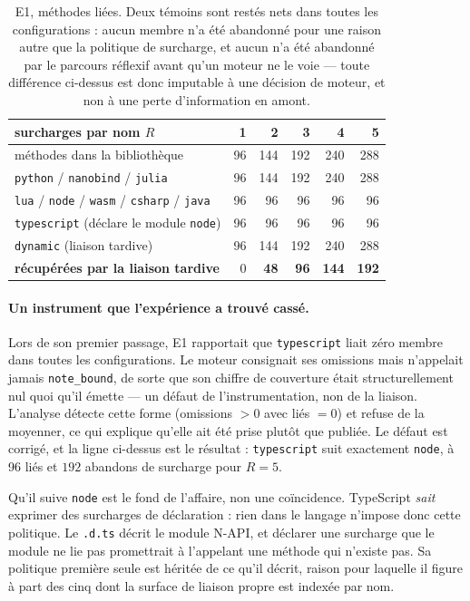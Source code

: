 \documentclass[11pt,a4paper]{article}
\newcommand{\code}[1]{\texttt{\small #1}}
\begin{document}
\begin{table}[h]
\centering\small
\begin{tabular}{lrrrrr}
\toprule
surcharges par nom $R$ & 1 & 2 & 3 & 4 & 5 \\
\midrule
méthodes dans la bibliothèque                   & 96 & 144 & 192 & 240 & 288 \\
\code{python} / \code{nanobind} / \code{julia}  & 96 & 144 & 192 & 240 & 288 \\
\code{lua} / \code{node} / \code{wasm} / \code{csharp} / \code{java} & 96 & 96 & 96 & 96 & 96 \\
\code{typescript} (déclare le module \code{node}) & 96 & 96 & 96 & 96 & 96 \\
\code{dynamic} (liaison tardive)                & 96 & 144 & 192 & 240 & 288 \\
\midrule
\textbf{récupérées par la liaison tardive}      & 0 & \textbf{48} & \textbf{96} & \textbf{144} & \textbf{192} \\
\bottomrule
\end{tabular}
\caption{E1, méthodes liées. Deux témoins sont restés nets dans toutes les
configurations : aucun membre n'a été abandonné pour une raison autre que la
politique de surcharge, et aucun n'a été abandonné par le parcours réflexif avant
qu'un moteur ne le voie --- toute différence ci-dessus est donc imputable à une
décision de moteur, et non à une perte d'information en amont.}
\label{tab:e1}
\end{table}

\paragraph{Un instrument que l'expérience a trouvé cassé.} Lors de son premier
passage, E1 rapportait que \code{typescript} liait zéro membre dans toutes les
configurations. Le moteur consignait ses omissions mais n'appelait jamais
\code{note\_bound}, de sorte que son chiffre de couverture était structurellement
nul quoi qu'il émette --- un défaut de l'instrumentation, non de la liaison.
L'analyse détecte cette forme (omissions $>0$ avec liés $=0$) et refuse de la
moyenner, ce qui explique qu'elle ait été prise plutôt que publiée. Le défaut est
corrigé, et la ligne ci-dessus est le résultat : \code{typescript} suit
exactement \code{node}, à 96 liés et $192$ abandons de surcharge pour $R=5$.

Qu'il suive \code{node} est le fond de l'affaire, non une coïncidence. TypeScript
\emph{sait} exprimer des surcharges de déclaration : rien dans le langage
n'impose donc cette politique. Le \code{.d.ts} décrit le module N-API, et
déclarer une surcharge que le module ne lie pas promettrait à l'appelant une
méthode qui n'existe pas. Sa politique \og première seule \fg{} est héritée de ce
qu'il décrit, raison pour laquelle il figure à part des cinq dont la surface de
liaison propre est indexée par nom.
\end{document}
